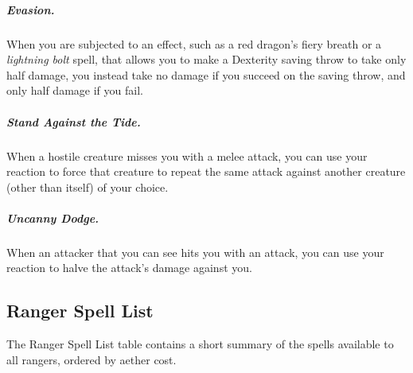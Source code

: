 \subparagraph*{Evasion.} When you are subjected to an effect, such as a red dragon's fiery breath or a \textit{lightning bolt} spell, that allows you to make a Dexterity saving throw to take only half damage, you instead take no damage if you succeed on the saving throw, and only half damage if you fail.

\subparagraph*{Stand Against the Tide.} When a hostile creature misses you with a melee attack, you can use your reaction to force that creature to repeat the same attack against another creature (other than itself) of your choice.

\subparagraph*{Uncanny Dodge.} When an attacker that you can see hits you with an attack, you can use your reaction to halve the attack's damage against you.

\subsection{Ranger Spell List}
The Ranger Spell List table contains a short summary of the spells available to all rangers, ordered by aether cost.


